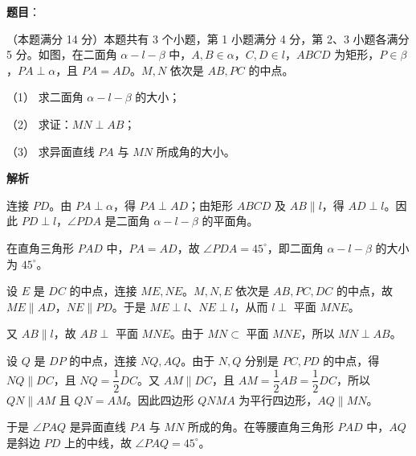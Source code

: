 \begin{answer}

\textbf{题目}：

（本题满分 14 分）本题共有 3 个小题，第 1 小题满分 4 分，第 2、3 小题各满分 5 分。如图，在二面角 $\alpha-l-\beta$ 中，$A,B\in\alpha$，$C,D\in l$，$ABCD$ 为矩形，$P\in\beta$，$PA\perp\alpha$，且 $PA=AD$。$M,N$ 依次是 $AB,PC$ 的中点。

（1） 求二面角 $\alpha-l-\beta$ 的大小；

（2） 求证：$MN\perp AB$；

（3） 求异面直线 $PA$ 与 $MN$ 所成角的大小。
\nopagebreak[4]
\begin{center}\end{center}
\nopagebreak[4]
\textbf{解析}
\nopagebreak[4]
\begin{center}\end{center}
\nopagebreak[4]

连接 $PD$。由 $PA\perp\alpha$，得 $PA\perp AD$；由矩形 $ABCD$ 及 $AB\parallel l$，得 $AD\perp l$。因此 $PD\perp l$，$\angle PDA$ 是二面角 $\alpha-l-\beta$ 的平面角。

在直角三角形 $PAD$ 中，$PA=AD$，故 $\angle PDA=45^\circ$，即二面角 $\alpha-l-\beta$ 的大小为 $45^\circ$。


设 $E$ 是 $DC$ 的中点，连接 $ME,NE$。$M,N,E$ 依次是 $AB,PC,DC$ 的中点，故 $ME\parallel AD$，$NE\parallel PD$。于是 $ME\perp l$、$NE\perp l$，从而 $l\perp$ 平面 $MNE$。

又 $AB\parallel l$，故 $AB\perp$ 平面 $MNE$。由于 $MN\subset$ 平面 $MNE$，所以 $MN\perp AB$。


设 $Q$ 是 $DP$ 的中点，连接 $NQ,AQ$。由于 $N,Q$ 分别是 $PC,PD$ 的中点，得 $NQ\parallel DC$，且 $NQ=\dfrac12DC$。又 $AM\parallel DC$，且 $AM=\dfrac12AB=\dfrac12DC$，所以 $QN\parallel AM$ 且 $QN=AM$。因此四边形 $QNMA$ 为平行四边形，$AQ\parallel MN$。

于是 $\angle PAQ$ 是异面直线 $PA$ 与 $MN$ 所成的角。在等腰直角三角形 $PAD$ 中，$AQ$ 是斜边 $PD$ 上的中线，故 $\angle PAQ=45^\circ$。




\end{answer}
